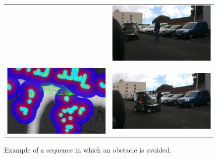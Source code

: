 \begin{figure}[h!]
\begin{tabular}{cc}
\begin{minipage}{.45\textwidth}
    \end{minipage} &
    \begin{minipage}{.45\textwidth}
      \centering
        \includegraphics[width=\textwidth]{seq10}\label{fig:cp07_seq2}
    \end{minipage}\\ \\
    \begin{minipage}{.45\textwidth}
        \centering
        \includegraphics[width=\textwidth]{example11}
    \end{minipage} &
    \begin{minipage}{.45\textwidth}
      \centering
        \includegraphics[width=\textwidth]{seq11}\label{fig:cp07_seq3}
    \end{minipage}
    \end{tabular} 
    \caption{Example of a sequence in which an obstacle is avoided.}\label{fig:cp07_sequence}
\end{figure}

